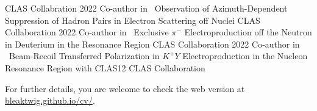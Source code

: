 \documentclass[a4paper]{cv-style}
\begin{document}
\begin{entrylist}
            {CLAS Collabration}
            {\vspace{-0.3cm}}
        \entry
            {2022}
            {{\normalfont Co-author in} ~Observation of Azimuth-Dependent Suppression of Hadron Pairs in Electron Scattering off Nuclei}
            {CLAS Collaboration}
            {\vspace{-0.3cm}}
        \entry
            {2022}
            {{\normalfont Co-author in} ~Exclusive $\pi^-$ Electroproduction off the Neutron in Deuterium in the Resonance Region}
            {CLAS Collaboration}
            {\vspace{-0.3cm}}
        \entry
            {2022}
            {{\normalfont Co-author in} ~Beam-Recoil Transferred Polarization in $K^+Y$ Electroproduction in the Nucleon Resonance Region with CLAS12}
            {CLAS Collaboration}
            {\vspace{-0.3cm}}
    \end{entrylist}

\vspace{0.4cm}
For further details, you are welcome to check the web version at \href{https://bleaktwig.github.io/cv/}{bleaktwig.github.io/cv/}.
\end{document}
